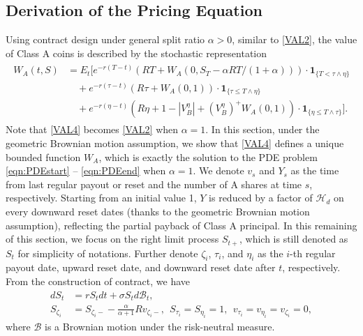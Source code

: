 \documentclass[11pt]{article}%
\numberwithin{equation}{section}
\theoremstyle{plain}
\begin{document}
\begin{appendices}

\section{Derivation of the Pricing Equation}
\label{dpe}
Using contract design under general split ratio $\alpha>0$, similar to \eqref{VAL2}, the value of Class A coins is described by the stochastic representation
\begin{align}
\begin{split}W_{A}(t,S) & =E_{t}\Bigg[e^{-r(T-t)}(RT+W_A(0,S_T-\alpha RT/(1+\alpha)))\cdot\mathbf{1}_{\{T<\tau\land\eta\}}\\
&\quad+e^{-r(\tau-t)}(R\tau+W_{A}(0,1))\cdot\mathbf{1}_{\{\tau\le T\land\eta\}}\\
 & \quad+e^{-r(\eta-t)}(R\eta+1-|V_{B}^{\eta}|+(V_{B}^{\eta})^+W_{A}(0,1))\cdot\mathbf{1}_{\{\eta\le T\land\tau\}}\Bigg].
\end{split}
\label{VAL4}
\end{align}
Note that \eqref{VAL4} becomes \eqref{VAL2} when $\alpha=1$. In this section, under the geometric Brownian motion assumption, we show that \eqref{VAL4} defines a unique bounded function $W_A$, which is exactly the solution to the PDE problem \eqref{eqn:PDEstart} -- \eqref{eqn:PDEend} when $\alpha=1$. We denote $v_s$ and $Y_s$ as the time from last regular payout or reset and the number of A shares at time $s$, respectively. Starting from an initial value 1, $Y$ is reduced by a factor of $\mathcal{H}_d$ on every downward reset dates (thanks to the geometric Brownian motion assumption), reflecting the partial payback of Class A principal. In this remaining of this section, we focus on the right limit process $S_{t+}$, which is still denoted as $S_t$ for simplicity of notations. Further denote $\zeta_i$, $\tau_i$, and $\eta_i$ as the $i$-th regular payout date, upward reset date, and downward reset date after $t$, respectively.
From the construction of contract, we have
\begin{align*}
dS_t &= rS_tdt+\sigma S_td\mathcal{B}_t,\\
S_{\zeta_i}&=S_{\zeta_i-}-\frac{\alpha}{\alpha+1}Rv_{\zeta_i-},~~ S_{\tau_i}=S_{\eta_i}=1, ~~v_{\tau_i}=v_{\eta_i}=v_{\zeta_i}=0,
\end{align*}
where $\mathcal{B}$ is a Brownian motion under the risk-neutral measure.


\end{appendices}
\end{document}
